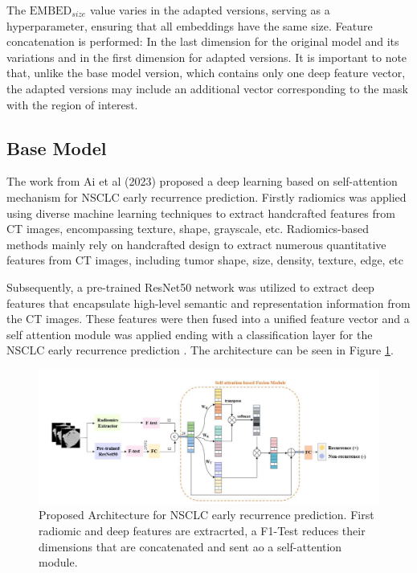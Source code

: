 \documentclass[journal,twoside,web]{ieeecolor}
\begin{document}
The $\text{EMBED}_{size}$ value varies in the adapted versions, serving as a hyperparameter, ensuring that all embeddings have the same size. Feature concatenation is performed: In the last dimension for the original model and its variations and in the first dimension for adapted versions. It is important to note that, unlike the base model version, which contains only one deep feature vector, the adapted versions may include an additional vector corresponding to the mask with the region of interest.

\subsection{Base Model}

The work from Ai et al (2023) proposed a deep learning based on self-attention mechanism for \gls{NSCLC} early recurrence prediction. Firstly radiomics was applied using diverse machine learning techniques to extract handcrafted features from \gls{CT} images, encompassing texture, shape, grayscale, etc. Radiomics-based methods mainly rely on handcrafted design to extract numerous quantitative  features from \gls{CT} images, including tumor shape, size, density,  texture, edge, etc \cite{aiSelfAttentionBasedFusion2023}

Subsequently, a pre-trained ResNet50 network was utilized to extract deep features that encapsulate high-level semantic and representation information from the \gls{CT} images. These features were then fused into a unified feature vector and a self attention module was applied ending with a classification layer for the \gls{NSCLC} early recurrence prediction \cite{aiSelfAttentionBasedFusion2023}. The architecture can be seen in Figure \ref{fig01}.


\begin{figure}[h]
\centerline{\includegraphics[width=\columnwidth]{figures/fig01.png}}
\caption{Proposed  Architecture for \gls{NSCLC} early recurrence prediction. First radiomic and deep features are extracrted, a F1-Test reduces their dimensions that are concatenated and sent ao a self-attention module.}
\label{fig01}
\end{figure}
\end{document}
